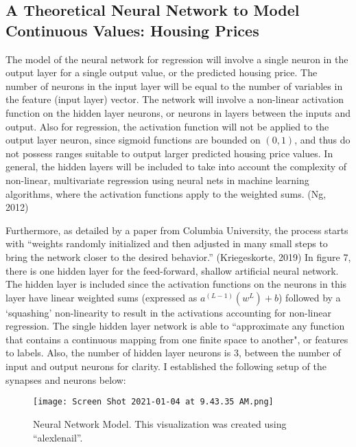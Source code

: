 \documentclass[12pt,a4paper]{article}
\begin{document}
\subsection{A Theoretical Neural Network to Model Continuous Values: Housing Prices}


The model of the neural network for regression will involve a single neuron in the output layer for a single output value, or the predicted housing price. The number of neurons in the input layer will be equal to the number of variables in the feature (input layer) vector. The network will involve a non-linear activation function on the hidden layer neurons, or neurons in layers between the inputs and output. Also for regression, the activation function will not be applied to the output layer neuron, since sigmoid functions are bounded on $(0,1)$, and thus do not possess ranges suitable to output larger predicted housing price values. In general, the hidden layers will be included to take into account the complexity of non-linear, multivariate regression using neural nets in machine learning algorithms, where the activation functions apply to the weighted sums. (Ng, 2012) 


Furthermore, as detailed by a paper from Columbia University, the process starts with “weights randomly initialized and then adjusted in many small steps to bring the network closer to the desired behavior.” (Kriegeskorte, 2019) In figure 7, there is one hidden layer for the feed-forward, shallow artificial neural network. The hidden layer is included since the activation functions on the neurons in this layer have linear weighted sums (expressed as  $a^{(L-1)}(w^L)+b$) followed by a ‘squashing’ non-linearity to result in the activations accounting for non-linear regression. The single hidden layer network is able to “approximate any function that contains a continuous mapping from one finite space to another", or features to labels. Also, the number of hidden layer neurons is 3, between the number of input and output neurons for clarity. I established the following setup of the synapses and neurons below:

\begin{figure}[h]
    \centering
    \texttt{[image: Screen Shot 2021-01-04 at 9.43.35 AM.png]}
    \caption{Neural Network Model. This visualization was created using “alexlenail”.}
    \label{fig:my_label}
\end{figure}
\end{document}
